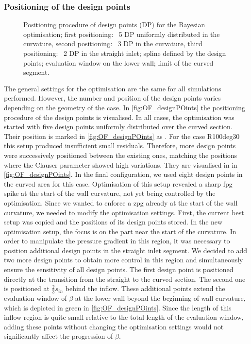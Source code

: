 \subsubsection{Positioning of the design points}

\begin{figure}[h!]
    \centering
    
    \caption[Positioning procedure of design points for the Bayesian optimisation]{Positioning procedure of design points (DP) for the Bayesian optimisation;
    first positioning: ~5 DP uniformly distributed in the curvature,
    second positioning: ~3 DP in the curvature,
    third positioning: ~2 DP in the straight inlet;
     spline defined by the design points;
     evaluation window on the lower wall;
     limit of the curved segment.
    }
    \label{fig:OF_designPOints}
\end{figure}


The general settings for the optimisation are the same for all simulations performed.
However, the number and position of the design points varies depending on the geometry of the case.
In \autoref{fig:OF_designPOints} the positioning procedure of the design points is visualised.
In all cases, the optimisation was started with five design points uniformly distributed over the curved section.  
Their position is marked in \autoref{fig:OF_designPOints} as .
For the case R100deg30 this setup produced insufficient small residuals. 
Therefore, more design points were successively positioned between the existing ones, matching the positions where the Clauser parameter showed high variations.
They are visualised in  in \autoref{fig:OF_designPOints}.
In the final configuration, we used eight design points in the curved area for this case.
Optimisation of this setup revealed a sharp \acrshort{fpg} spike at the start of the wall curvature, not yet being controlled by the optimisation.
Since we wanted to enforce a \acrshort{zpg} already at the start of the wall curvature, we needed to modify the optimisation settings.
First, the current best setup was copied and the positions of its design points stored. 
In the new optimisation setup, the focus is on the part near the start of the curvature.
In order to manipulate the pressure gradient in this region, it was necessary to position additional design points in the straight inlet segment. 
We decided to add two more design points to obtain more control in this region and simultaneously ensure the sensitivity of all design points.
The first design point is positioned directly at the transition from the straight to the curved section.
The second one is positioned at $\frac{2}{3}s_{in}$ behind the inflow.
These additional points extend the evaluation window of $\beta$ at the lower wall beyond the beginning of wall curvature, which is depicted in green in \autoref{fig:OF_designPOints}. 
Since the length of this inflow region is quite small relative to the total length of the evaluation window, adding these points without changing the optimisation settings would not significantly affect the progression of $\beta$.

